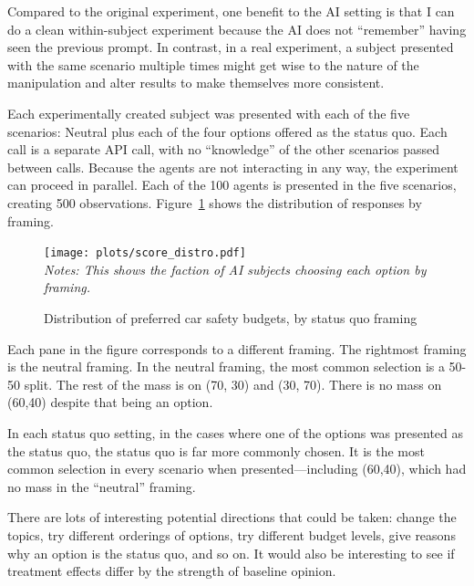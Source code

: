 \documentclass[11pt]{article}
\begin{document}
Compared to the original experiment, one benefit to the AI setting is that I can do a clean within-subject experiment because the AI does not ``remember'' having seen the previous prompt.
In contrast, in a real experiment, a subject presented with the same scenario multiple times might get wise to the nature of the manipulation and alter results to make themselves more consistent.

Each experimentally created subject was presented with each of the five scenarios:
Neutral plus each of the four options offered as the status quo.
Each call is a separate API call, with no ``knowledge'' of the other scenarios passed between calls.
Because the agents are not interacting in any way, the experiment can proceed in parallel.
Each of the 100 agents is presented in the five scenarios, creating 500 observations.
Figure~\ref{fig:score_distro} shows the distribution of responses by framing.

\begin{figure}[h!]
  \caption{Distribution of preferred car safety budgets, by status quo framing} \label{fig:score_distro}
  \centering
  \begin{minipage}{0.99\textwidth}
    \texttt{[image: plots/score\_distro.pdf]}
{\footnotesize \\
  \emph{Notes: This shows the faction of AI subjects choosing each option by framing.} 
}
\end{minipage} 
\end{figure}

Each pane in the figure corresponds to a different framing. 
The rightmost framing is the neutral framing.
In the neutral framing, the most common selection is a 50-50 split.
The rest of the mass is on (70, 30) and (30, 70).
There is no mass on (60,40) despite that being an option.

In each status quo setting, in the cases where one of the options was presented as the status quo, the status quo is far more commonly chosen.
It is the most common selection in every scenario when presented---including (60,40), which had no mass in the ``neutral'' framing.

There are lots of interesting potential directions that could be taken: change the topics, try different orderings of options, try different budget levels, give reasons why an option is the status quo, and so on.
It would also be interesting to see if treatment effects differ by the strength of baseline opinion.
\end{document}
